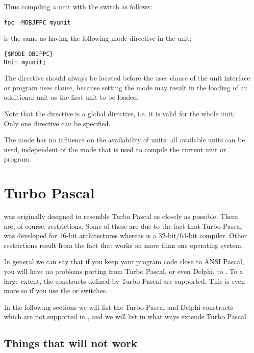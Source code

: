 Thus compiling a unit with the  switch as follows:
\begin{verbatim}
fpc -MOBJFPC myunit
\end{verbatim}
is the same as having the following mode directive in the unit:
\begin{verbatim}
{$MODE OBJFPC}
Unit myunit;
\end{verbatim}
The  directive should always be located before the uses clause of the unit
interface or program uses clause, because setting the mode may result in the
loading of an additional unit as the first unit to be loaded.

Note that the  directive is a global directive, i.e. it is
valid for the whole unit; Only one directive can be specified.

The mode has no influence on the availability of units: all available
units can be used, independent of the mode that is used to compile 
the current unit or program.

\section{Turbo Pascal}
\fpc was originally designed to resemble Turbo Pascal as closely as possible. 
There are, of course, restrictions. Some of these are due to the fact that
Turbo Pascal was developed  for 16-bit architectures whereas  \fpc is
a 32-bit/64-bit compiler. Other restrictions result from the fact that \fpc works
on more than one operating system.

In general we can say that if you keep your program code close to ANSI
Pascal, you will have no problems porting from Turbo Pascal, or even Delphi, to
\fpc. To a large extent, the constructs defined by Turbo Pascal are
supported. This is even more so if you use the  or 
switches.

In the following sections we will list the Turbo Pascal and Delphi 
constructs which are not supported in \fpc, and we will list in what
ways \fpc extends Turbo Pascal.

\subsection{Things that will not work}

